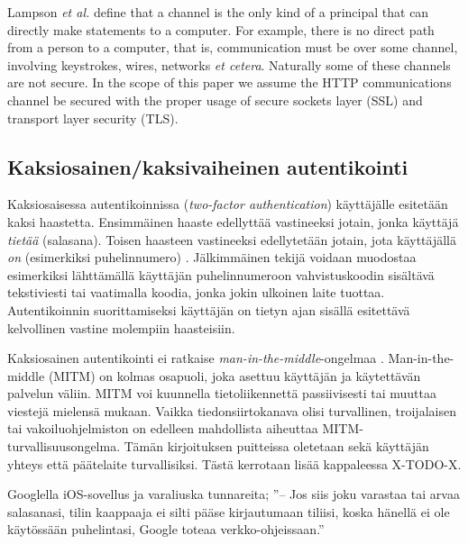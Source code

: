 \documentclass[english,gradu]{tktltiki}
\begin{document}
          Lampson \emph{et al.} \cite{lampson_distributed_1992} define that a channel is the only kind of a principal that can directly make statements to a computer. For example, there is no direct path from a person to a computer, that is, communication must be over some channel,
involving keystrokes, wires, networks \emph{et cetera}. Naturally some of these channels are not secure. In the scope of this paper we assume
the HTTP communications channel be secured with the proper usage of secure sockets layer (SSL) and transport layer security (TLS).





\subsection{Kaksiosainen/kaksivaiheinen autentikointi} %
\label{sub:kaksiosainen_autentikointi}

Kaksiosaisessa autentikoinnissa (\emph{two-factor authentication}) käyttäjälle esitetään kaksi haastetta. Ensimmäinen haaste edellyttää vastineeksi jotain, jonka käyttäjä \emph{tietää} (salasana). Toisen haasteen vastineeksi edellytetään jotain, jota käyttäjällä \emph{on} (esimerkiksi puhelinnumero) \cite{NIST_SP800-63, google_2step_2010}. Jälkimmäinen tekijä voidaan muodostaa esimerkiksi lähttämällä käyttäjän puhelinnumeroon vahvistuskoodin sisältävä tekstiviesti tai vaatimalla koodia, jonka jokin ulkoinen laite tuottaa. Autentikoinnin suorittamiseksi käyttäjän on tietyn ajan sisällä esitettävä kelvollinen vastine molempiin haasteisiin.

Kaksiosainen autentikointi ei ratkaise \emph{man-in-the-middle}-ongelmaa \cite{schneier_2factor_2005}.
Man-in-the-middle (MITM) on kolmas osapuoli, joka asettuu käyttäjän ja käytettävän palvelun väliin. MITM voi kuunnella tietoliikennettä passiivisesti tai muuttaa viestejä mielensä mukaan. Vaikka tiedonsiirtokanava olisi turvallinen, troijalaisen tai vakoiluohjelmiston on edelleen mahdollista aiheuttaa MITM-turvallisuusongelma. Tämän kirjoituksen puitteissa oletetaan sekä käyttäjän yhteys että päätelaite turvallisiksi. Tästä kerrotaan lisää kappaleessa X-TODO-X.

Googlella iOS-sovellus ja varaliuska tunnareita; ''-- Jos siis joku varastaa tai arvaa salasanasi, tilin kaappaaja ei silti pääse kirjautumaan tiliisi, koska hänellä ei ole käytössään puhelintasi, Google toteaa verkko-ohjeissaan.''
\end{document}
